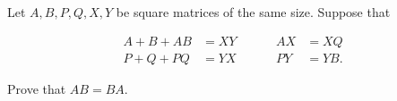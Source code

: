 Let $A, B, P, Q, X, Y$ be square matrices of the same size. Suppose that

$$
\begin{aligned}
A + B + AB & = XY & \hspace{1cm} AX & = XQ \\
P + Q + PQ & = YX & \hspace{1cm} PY & = YB.
\end{aligned}
$$

Prove that $AB = BA$.
